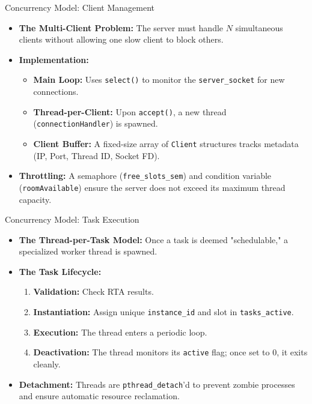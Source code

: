 \begin{frame}{Concurrency Model: Client Management}
    \begin{itemize}
        \item \textbf{The Multi-Client Problem:} The server must handle $N$ simultaneous clients without allowing one slow client to block others.
        \item \textbf{Implementation:} 
        \begin{itemize}
            \item \textbf{Main Loop:} Uses \texttt{select()} to monitor the \texttt{server\_socket} for new connections.
            \item \textbf{Thread-per-Client:} Upon \texttt{accept()}, a new thread (\texttt{connectionHandler}) is spawned.
            \item \textbf{Client Buffer:} A fixed-size array of \texttt{Client} structures tracks metadata (IP, Port, Thread ID, Socket FD).
        \end{itemize}
        \item \textbf{Throttling:} A semaphore (\texttt{free\_slots\_sem}) and condition variable (\texttt{roomAvailable}) ensure the server does not exceed its maximum thread capacity.
    \end{itemize}
\end{frame}

\begin{frame}{Concurrency Model: Task Execution}
    \begin{itemize}
        \item \textbf{The Thread-per-Task Model:} Once a task is deemed "schedulable," a specialized worker thread is spawned.
        \item \textbf{The Task Lifecycle:}
        \begin{enumerate}
            \item \textbf{Validation:} Check RTA results.
            \item \textbf{Instantiation:} Assign unique \texttt{instance\_id} and slot in \texttt{tasks\_active}.
            \item \textbf{Execution:} The thread enters a periodic loop.
            \item \textbf{Deactivation:} The thread monitors its \texttt{active} flag; once set to 0, it exits cleanly.
        \end{enumerate}
        \item \textbf{Detachment:} Threads are \texttt{pthread\_detach}'d to prevent zombie processes and ensure automatic resource reclamation.
    \end{itemize}
\end{frame}

